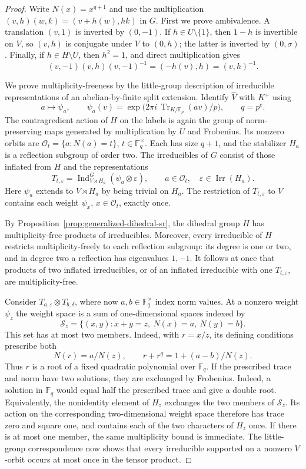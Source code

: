 \documentclass[11pt,a4paper]{amsart}
\theoremstyle{definition}
\theoremstyle{remark}
\numberwithin{equation}{section}
\begin{document}
\begin{proof}
Write $N(x)=x^{q+1}$ and use the multiplication
$(v,h)(w,k)=(v+h(w),hk)$ in $G$.
First we prove ambivalence. A translation $(v,1)$ is inverted by
$(0,-1)$. If $h\in U\setminus\{1\}$, then $1-h$ is invertible on
$V$, so $(v,h)$ is conjugate under $V$ to $(0,h)$; the latter is
inverted by $(0,\sigma)$. Finally, if $h\in H\setminus U$, then
$h^2=1$, and direct multiplication gives
\[
 (v,-1)(v,h)(v,-1)^{-1}=(-h(v),h)=(v,h)^{-1}.
\]

We prove multiplicity-freeness by the little-group description of
irreducible representations of an abelian-by-finite split extension.
Identify $\widehat V$ with $K^+$ using
\[
 a\longmapsto\psi_a,\qquad
 \psi_a(v)=\exp\bigl(2\pi i\,\operatorname{Tr}_{K/\mathbb F_p}(av)/p\bigr),
 \qquad q=p^e.
\]
The contragredient action of $H$ on the labels is again the group of
norm-preserving maps generated by multiplication by $U$ and Frobenius.
Its nonzero orbits are
$\mathcal O_t=\{a:N(a)=t\}$, $t\in\mathbb F_q^\times$.
Each has size $q+1$, and the stabilizer $H_a$ is a reflection subgroup
of order two. The irreducibles of $G$ consist of those inflated from
$H$ and the representations
\[
 T_{t,\varepsilon}
 =\operatorname{Ind}_{V\rtimes H_a}^{G}
       (\psi_a\otimes\varepsilon),
 \qquad a\in\mathcal O_t,\quad
 \varepsilon\in\operatorname{Irr}(H_a).
\]
Here $\psi_a$ extends to $V\rtimes H_a$ by being trivial on $H_a$.
The restriction of $T_{t,\varepsilon}$ to $V$ contains each weight
$\psi_x$, $x\in\mathcal O_t$, exactly once.

By Proposition~\ref{prop:generalized-dihedral-sr}, the dihedral
group $H$ has multiplicity-free products of irreducibles.
Moreover, every irreducible of $H$ restricts multiplicity-freely to
each reflection subgroup: its degree is one or two, and in degree two
a reflection has eigenvalues $1,-1$. It follows at once that products
of two inflated irreducibles, or of an inflated irreducible with one
$T_{t,\varepsilon}$, are multiplicity-free.

Consider $T_{a,\varepsilon}\otimes T_{b,\delta}$, where now
$a,b\in\mathbb F_q^\times$ index norm values. At a nonzero weight
$\psi_z$ the weight space is a sum of one-dimensional spaces indexed by
\[
 \mathcal S_z=\{(x,y):x+y=z,\ N(x)=a,\ N(y)=b\}.
\]
This set has at most two members. Indeed, with $r=x/z$, its defining
conditions prescribe both
\[
 N(r)=a/N(z),\qquad
 r+r^q=1+(a-b)/N(z).
\]
Thus $r$ is a root of a fixed quadratic polynomial over $\mathbb F_q$.
If the prescribed trace and norm have two solutions, they are
exchanged by Frobenius. Indeed, a solution in $\mathbb F_q$ would
equal half the prescribed trace and give a double root. Equivalently,
the nonidentity element of $H_z$ exchanges the two members of
$\mathcal S_z$. Its action on the corresponding two-dimensional
weight space therefore has trace zero and square one, and contains
each of the two characters of $H_z$ once. If there is at most one
member, the same multiplicity bound is immediate. The little-group
correspondence now shows that every irreducible supported on a
nonzero $V$-orbit occurs at most once in the tensor product.


\end{proof}
\end{document}
